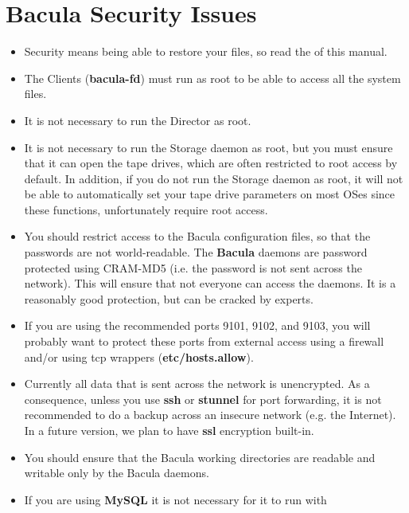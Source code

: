 
\section*{Bacula Security Issues}
\label{_ChapterStart14}

\begin{itemize}
\item Security means being able to restore your files, so read the 
    of this manual.
\item The Clients ({\bf bacula-fd}) must run as root to be able to access  all
   the system files. 
\item It is not necessary to run the Director as root. 
\item It is not necessary to run the Storage daemon as root, but you  must
   ensure that it can open the tape drives, which are often restricted to root
   access by default. In addition, if you do not run the Storage daemon as root,
   it will not be able to automatically set your tape drive parameters on most
   OSes since these functions, unfortunately require root access.
\item You should restrict access to the Bacula configuration files,  so that
   the passwords are not world-readable. The {\bf Bacula}  daemons are password
   protected using CRAM-MD5 (i.e. the password is not  sent across the network).
   This will ensure that not everyone  can access the daemons. It is a reasonably
   good protection, but  can be cracked by experts. 
\item If you are using the recommended ports 9101, 9102, and 9103, you  will
   probably want to protect these ports from external access  using a firewall
   and/or using tcp wrappers ({\bf etc/hosts.allow}).  
\item Currently all data that is sent across the network is unencrypted.  As a
   consequence, unless you use {\bf ssh} or {\bf stunnel} for  port forwarding,
   it is not recommended to do a backup across an  insecure network (e.g. the
Internet). In a future version, we plan  to have {\bf ssl} encryption
built-in. 
\item You should ensure that the Bacula working directories are  readable and
   writable only by the Bacula daemons. 
\item If you are using {\bf MySQL} it is not necessary for it to  run with

\end{itemize}
